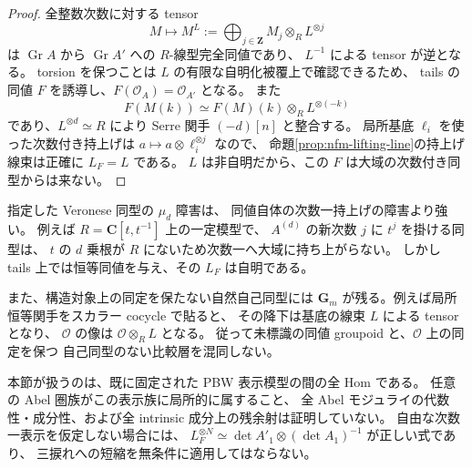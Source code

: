 \begin{proof}
全整数次数に対する tensor
\[
 M\longmapsto M^L:=\bigoplus_{j\in\mathbf Z}M_j\otimes_RL^{\otimes j}
\]
は $\operatorname{Gr}A$ から $\operatorname{Gr}A'$ への $R$-線型完全同値であり、
$L^{-1}$ による tensor が逆となる。
torsion を保つことは $L$ の有限な自明化被覆上で確認できるため、
tails の同値 $F$ を誘導し、$F(\mathcal O_A)=\mathcal O_{A'}$ となる。
また
\[
 F(M(k))\simeq F(M)(k)\otimes_RL^{\otimes(-k)}
\]
であり、$L^{\otimes d}\simeq R$ により Serre 関手 $(-d)[n]$ と整合する。
局所基底 $\ell_i$ を使った次数付き持上げは
$a\mapsto a\otimes\ell_i^{\otimes j}$ なので、
命題\ref{prop:nfm-lifting-line}の持上げ線束は正確に $L_F=L$ である。
$L$ は非自明だから、この $F$ は大域の次数付き同型からは来ない。
\end{proof}

\begin{remark}[二つの障害の区別と残る問題]
指定した Veronese 同型の $\mu_d$ 障害は、
同値自体の次数一持上げの障害より強い。
例えば $R=\mathbf C[t,t^{-1}]$ 上の一定模型で、
$A^{(d)}$ の新次数 $j$ に $t^j$ を掛ける同型は、
$t$ の $d$ 乗根が $R$ にないため次数一へ大域に持ち上がらない。
しかし tails 上では恒等同値を与え、その $L_F$ は自明である。

また、構造対象上の同定を保たない自然自己同型には
$\mathbf G_m$ が残る。例えば局所恒等関手をスカラー cocycle で貼ると、
その降下は基底の線束 $L$ による tensor となり、
$\mathcal O$ の像は $\mathcal O\otimes_RL$ となる。
従って未標識の同値 groupoid と、$\mathcal O$ 上の同定を保つ
自己同型のない比較層を混同しない。

本節が扱うのは、既に固定された PBW 表示模型の間の全 Hom である。
任意の Abel 圏族がこの表示族に局所的に属すること、
全 Abel モジュライの代数性・成分性、および全 intrinsic 成分上の残余射は証明していない。
自由な次数一表示を仮定しない場合には、
$L_F^{\otimes N}\simeq
\det A'_1\otimes(\det A_1)^{-1}$ が正しい式であり、
三捩れへの短縮を無条件に適用してはならない。
\end{remark}
